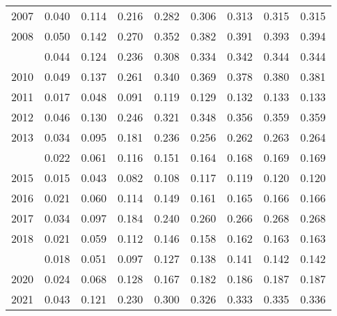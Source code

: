 \documentclass[
]{article}
\begin{document}
\begin{longtable}[t]{lrrrrrrrr}
2007 & 0.040 & 0.114 & 0.216 & 0.282 & 0.306 & 0.313 & 0.315 & 0.315\\
2008 & 0.050 & 0.142 & 0.270 & 0.352 & 0.382 & 0.391 & 0.393 & 0.394\\
\addlinespace
2009 & 0.044 & 0.124 & 0.236 & 0.308 & 0.334 & 0.342 & 0.344 & 0.344\\
2010 & 0.049 & 0.137 & 0.261 & 0.340 & 0.369 & 0.378 & 0.380 & 0.381\\
2011 & 0.017 & 0.048 & 0.091 & 0.119 & 0.129 & 0.132 & 0.133 & 0.133\\
2012 & 0.046 & 0.130 & 0.246 & 0.321 & 0.348 & 0.356 & 0.359 & 0.359\\
2013 & 0.034 & 0.095 & 0.181 & 0.236 & 0.256 & 0.262 & 0.263 & 0.264\\
\addlinespace
2014 & 0.022 & 0.061 & 0.116 & 0.151 & 0.164 & 0.168 & 0.169 & 0.169\\
2015 & 0.015 & 0.043 & 0.082 & 0.108 & 0.117 & 0.119 & 0.120 & 0.120\\
2016 & 0.021 & 0.060 & 0.114 & 0.149 & 0.161 & 0.165 & 0.166 & 0.166\\
2017 & 0.034 & 0.097 & 0.184 & 0.240 & 0.260 & 0.266 & 0.268 & 0.268\\
2018 & 0.021 & 0.059 & 0.112 & 0.146 & 0.158 & 0.162 & 0.163 & 0.163\\
\addlinespace
2019 & 0.018 & 0.051 & 0.097 & 0.127 & 0.138 & 0.141 & 0.142 & 0.142\\
2020 & 0.024 & 0.068 & 0.128 & 0.167 & 0.182 & 0.186 & 0.187 & 0.187\\
2021 & 0.043 & 0.121 & 0.230 & 0.300 & 0.326 & 0.333 & 0.335 & 0.336\\*
\end{longtable}
\end{document}
